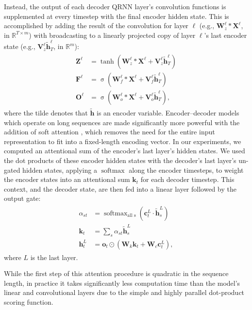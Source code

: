 \documentclass{article} %
\DeclareMathOperator*{\softmax}{softmax}
\DeclareMathOperator*{\sigmoid}{\sigma}
\begin{document}
Instead, the output of each decoder QRNN layer's convolution functions is supplemented at every timestep with the final encoder hidden state. This is accomplished by adding the result of the convolution for layer $\ell$ (e.g., $\mathbf{W}_z^\ell*\mathbf{X}^\ell$, in $\mathbb{R}^{T\times m}$) with broadcasting to a linearly projected copy of layer $\ell$'s last encoder state (e.g., $\mathbf{V}_z^\ell\mathbf{\tilde{h}}_T^\ell$, in $\mathbb{R}^m$):
\begin{align}
\begin{split}\label{decoder-conv}
\mathbf{Z}^\ell&=\tanh(\mathbf{W}_z^\ell*\mathbf{X}^\ell+\mathbf{V}_z^\ell\mathbf{\tilde{h}}^\ell_T)\\
\mathbf{F}^\ell&=\sigmoid(\mathbf{W}_f^\ell*\mathbf{X}^\ell+\mathbf{V}_f^\ell\mathbf{\tilde{h}}^\ell_T)\\
\mathbf{O}^\ell&=\sigmoid(\mathbf{W}_o^\ell*\mathbf{X}^\ell+\mathbf{V}_o^\ell\mathbf{\tilde{h}}^\ell_T),
\end{split}
\end{align}
where the tilde denotes that $\mathbf{\tilde{h}}$ is an encoder variable.
Encoder--decoder models which operate on long sequences are made significantly more powerful with the addition of soft attention \citep{Bahdanau2015}, which removes the need for the entire input representation to fit into a fixed-length encoding vector. In our experiments, we computed an attentional sum of the encoder's last layer's hidden states. We used the dot products of these encoder hidden states with the decoder's last layer's un-gated hidden states, applying a $\softmax$ along the encoder timesteps, to weight the encoder states into an attentional sum $\mathbf{k}_t$ for each decoder timestep.
This context, and the decoder state, are then fed into a linear layer followed by the output gate:
\begin{align}
\begin{split}\label{attn}
\alpha_{st}&=\softmax_\text{all s}(\mathbf{c}^L_t\cdot\mathbf{\tilde{h}}^L_s)\\
\mathbf{k}_t&=\sum_s\alpha_{st}\mathbf{\tilde{h}}^L_s\\
\mathbf{h}^L_t&=\mathbf{o}_t\odot(\mathbf{W}_k\mathbf{k}_t+\mathbf{W}_c \mathbf{c}^L_t),
\end{split}
\end{align}
where $L$ is the last layer.

While the first step of this attention procedure is quadratic in the sequence length, in practice it takes significantly less computation time than the model's linear and convolutional layers due to the simple and highly parallel dot-product scoring function.
\end{document}
